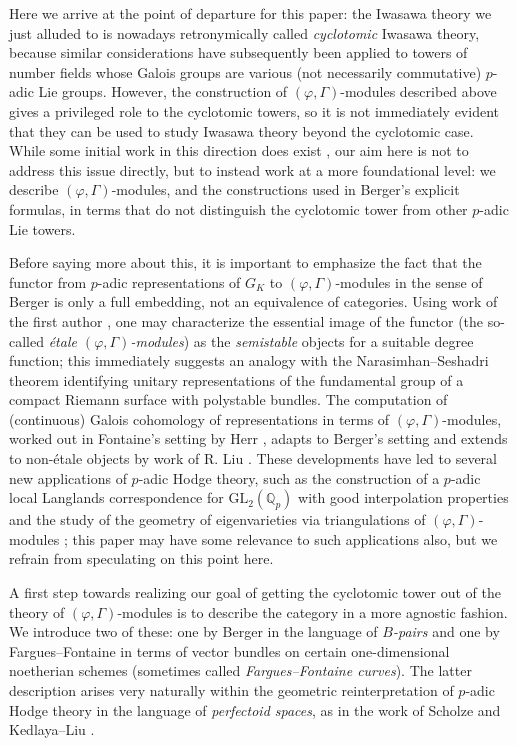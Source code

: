 \documentclass[12pt]{amsart}
\theoremstyle{definition}
\numberwithin{equation}{theorem}
\begin{document}
Here we arrive at the point of departure for this paper: the Iwasawa theory we just alluded to is nowadays retronymically called \emph{cyclotomic} Iwasawa theory, because similar considerations have subsequently been applied to towers of number fields whose Galois groups are various (not necessarily commutative) $p$-adic Lie groups.
However, the construction of $(\varphi, \Gamma)$-modules described above gives a privileged role to the cyclotomic towers, so it is not immediately evident that they can be used to study Iwasawa theory beyond the cyclotomic case. While some initial work in this direction does exist \cite{berger-fourquaux, berger-schneider-xie, schneider-venjakob}, our aim here is not to address this issue directly, but to instead work at a more foundational level: we describe $(\varphi, \Gamma)$-modules, and the constructions used in Berger's explicit formulas, in terms that do not distinguish the cyclotomic tower from other $p$-adic Lie towers.

Before saying more about this, it is important to emphasize the fact that the functor from 
$p$-adic representations of $G_K$ to $(\varphi, \Gamma)$-modules in the sense of Berger is only a full embedding, not an equivalence of categories.
Using work of the first author \cite{kedlaya-annals}, one may characterize the essential image of the functor (the so-called \emph{\'etale $(\varphi, \Gamma)$-modules}) as the \emph{semistable} objects for a suitable degree function; this immediately suggests an analogy with the Narasimhan--Seshadri theorem \cite{narasimhan-seshadri} identifying unitary representations of the fundamental group of a compact Riemann surface with polystable bundles.
The computation of (continuous) Galois cohomology of representations in terms of $(\varphi, \Gamma)$-modules, worked out in Fontaine's setting by Herr \cite{herr, herr-tate},
adapts to Berger's setting and extends to non-\'etale objects by work of R. Liu \cite{liu-herr}. These developments have led to several new applications of $p$-adic Hodge theory, such as the construction of a $p$-adic local Langlands correspondence for $\mathrm{GL}_2(\mathbb{Q}_p)$ with good interpolation properties
\cite{colmez-langlands} and the study of the geometry of eigenvarieties via triangulations
of $(\varphi, \Gamma)$-modules \cite{kpx, bergdall, breuil-hellmann-schraen, breuil-hellmann-schraen2}; this paper may have some relevance to such applications also, but we refrain from speculating on this point here.

A first step towards realizing our goal of getting the cyclotomic tower out of the theory of $(\varphi, \Gamma)$-modules is to describe the category in a more agnostic fashion.
We introduce two of these: one by Berger in the language of \emph{$B$-pairs} and one by Fargues--Fontaine in terms of vector bundles on certain one-dimensional noetherian schemes
(sometimes called \emph{Fargues--Fontaine curves}). 
The latter description arises very naturally within the geometric reinterpretation of $p$-adic Hodge theory in the language of \emph{perfectoid spaces}, as in the work of Scholze \cite{scholze1, scholze2, scholze-icm} and Kedlaya--Liu \cite{kedlaya-liu1, kedlaya-liu2}.
\end{document}
